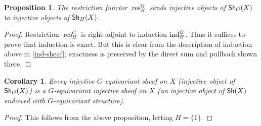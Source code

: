 \documentclass[letter]{amsart}
\newtheorem{corollary}[thm]{Corollary}
\newtheorem{proposition}[thm]{Proposition}
\theoremstyle{definition}
\theoremstyle{remark}
\numberwithin{thm}{section}
\numberwithin{equation}{section}
\DeclareMathOperator{\res}{res}
\begin{document}
\begin{proposition}
The restriction functor $\res_H^G$ sends injective objects of ${\mathsf{Sh}}_G(X)$ to injective objects of ${\mathsf{Sh}}_H(X)$.  
\end{proposition}
\begin{proof}
Restriction $\res_H^G$ is right-adjoint to induction $\operatorname{ind}_H^G$.  Thus it suffices to prove that induction is exact.  But this is clear from the description of induction above in \eqref{ind-sheaf}; exactness is preserved by the direct sum and pullback shown there.  
\end{proof}

\begin{corollary}
Every injective $G$-equivariant sheaf on $X$ (injective object of ${\mathsf{Sh}}_G(X)$) is a $G$-equivariant injective sheaf on $X$ (an injective object of ${\mathsf{Sh}}(X)$ endowed with $G$-equivariant structure).
\end{corollary}
\begin{proof}
This follows from the above proposition, letting $H = \{ 1 \}$.
\end{proof}
\end{document}

